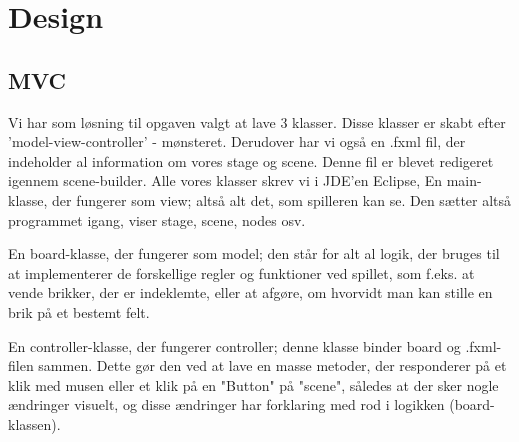 \section{Design}
\subsection{MVC}\label{MVC}
Vi har som løsning til opgaven valgt at lave 3 klasser. Disse klasser er skabt efter 'model-view-controller' - mønsteret. Derudover har vi også en .fxml fil, der indeholder al information om vores stage og scene. Denne fil er blevet redigeret igennem scene-builder. Alle vores klasser skrev vi i JDE'en Eclipse, 
En main-klasse, der fungerer som view; altså alt det, som spilleren kan se. Den sætter altså programmet igang, viser stage, scene, nodes osv. 

En board-klasse, der fungerer som model; den står for alt al logik, der bruges til at implementerer de forskellige regler og funktioner ved spillet, som f.eks. at vende brikker, der er indeklemte, eller at afgøre, om hvorvidt man kan stille en brik på et bestemt felt. 

En controller-klasse, der fungerer controller; denne klasse binder board og .fxml-filen sammen. Dette gør den ved at lave en masse metoder, der responderer på et klik med musen eller et klik på en "Button" på "scene", således at der sker nogle ændringer visuelt, og disse ændringer har forklaring med rod i logikken (board-klassen).